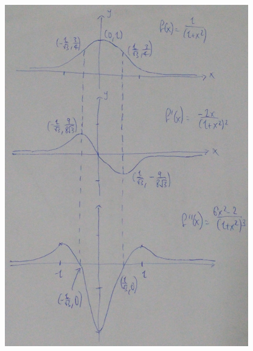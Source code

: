 \documentclass[9pt]{article}
\begin{document}
\begin{center}
  \includegraphics[]{q2.jpg}
\end{center}
\end{document}
